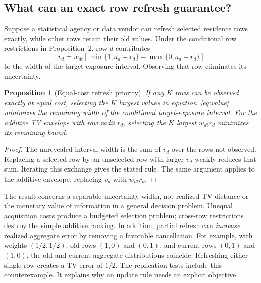 \documentclass[11pt,a4paper]{article}
\newtheorem{proposition}{Proposition}
\begin{document}
\subsection{What can an exact row refresh guarantee?}
Suppose a statistical agency or data vendor can refresh selected residence rows exactly, while other rows retain their old values. Under the conditional row restrictions in Proposition~2, row $d$ contributes
\begin{equation}
 v_d=w_{dt}\left[\min\{1,a_d+r_d\}-\max\{0,a_d-r_d\}\right]
 \label{eq:value}
\end{equation}
to the width of the target-exposure interval. Observing that row eliminates its uncertainty.

\begin{proposition}[Equal-cost refresh priority]
If any $K$ rows can be observed exactly at equal cost, selecting the $K$ largest values in equation~\eqref{eq:value} minimizes the remaining width of the conditional target-exposure interval. For the additive TV envelope with row radii $r_d$, selecting the $K$ largest $w_{dt}r_d$ minimizes its remaining bound.
\end{proposition}
\begin{proof}
The unrevealed interval width is the sum of $v_d$ over the rows not observed. Replacing a selected row by an unselected row with larger $v_d$ weakly reduces that sum. Iterating this exchange gives the stated rule. The same argument applies to the additive envelope, replacing $v_d$ with $w_{dt}r_d$.
\end{proof}

The result concerns a separable uncertainty width, not realized TV distance or the monetary value of information in a general decision problem. Unequal acquisition costs produce a budgeted selection problem; cross-row restrictions destroy the simple additive ranking. In addition, partial refresh can \emph{increase} realized aggregate error by removing a favorable cancellation. For example, with weights $(1/2,1/2)$, old rows $(1,0)$ and $(0,1)$, and current rows $(0,1)$ and $(1,0)$, the old and current aggregate distributions coincide. Refreshing either single row creates a TV error of $1/2$. The replication tests include this counterexample. It explains why an update rule needs an explicit objective.
\end{document}
